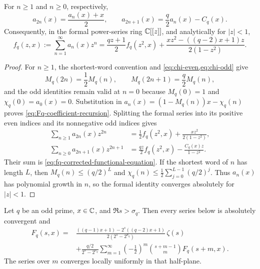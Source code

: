 \begin{proposition}
\label{prop:Fq-coefficient-recursion}
For $n\geq1$ and $n\geq0$, respectively,
\begin{equation}
 \label{eq:Fq-coefficient-recursion}
 a_{2n}(x)=\frac{a_n(x)+x}{2},
 \qquad
 a_{2n+1}(x)=\frac q2a_n(x)-C_q(x).
\end{equation}
Consequently, in the formal power-series ring $\mathbb C[[z]]$, and analytically
for $|z|<1$,
\begin{equation}
 \label{eq:fq-corrected-functional-equation}
 f_q(z,x):=\sum_{n=1}^{\infty}a_n(x)z^n
 =\frac{qz+1}{2}f_q(z^2,x)
  +\frac{xz^2-((q-2)x+1)z}{2(1-z^2)}.
\end{equation}
\end{proposition}

\begin{proof}
For $n\geq1$, the shortest-word convention and
\cref{eq:chi-even,eq:chi-odd} give
\[
 M_q(2n)=\frac12M_q(n),\qquad
 M_q(2n+1)=\frac q2M_q(n),
\]
and the odd identities remain valid at $n=0$ because $M_q(0)=1$ and
$\chi_q(0)=a_0(x)=0$.  Substitution in
$a_n(x)=(1-M_q(n))x-\chi_q(n)$ proves
\cref{eq:Fq-coefficient-recursion}.  Splitting the formal series into its
positive even indices and its nonnegative odd indices gives
\begin{align*}
 \sum_{n\geq1}a_{2n}(x)z^{2n}
 &=\frac12f_q(z^2,x)+\frac{xz^2}{2(1-z^2)},\\
 \sum_{n\geq0}a_{2n+1}(x)z^{2n+1}
 &=\frac{qz}{2}f_q(z^2,x)-\frac{C_q(x)z}{1-z^2}.
\end{align*}
Their sum is \cref{eq:fq-corrected-functional-equation}.  If the shortest
word of $n$ has length $L$, then
$M_q(n)\leq(q/2)^L$ and
$\chi_q(n)\leq\frac12\sum_{j=0}^{L-1}(q/2)^j$.
Thus $a_n(x)$ has polynomial growth in $n$, so the formal identity
converges absolutely for $|z|<1$.
\end{proof}

\begin{theorem}
\label{thm:Fq-corrected-functional-equation}
Let $q$ be an odd prime, $x\in\mathbb C$, and
$\Re s>\sigma_q$.  Then every series below is absolutely convergent and
\begin{equation}
\label{eq:Fq-functional-equation}
\begin{split}
 F_q(s,x)={}&
 \frac{((q-1)x+1)-2^s((q-2)x+1)}
      {2(2^s-2^{\sigma_q})}\,\zeta(s)\\
 &+\frac{q/2}{2^s-2^{\sigma_q}}
 \sum_{m=1}^{\infty}\left(-\frac12\right)^m
 \binom{s+m-1}{m}F_q(s+m,x).
\end{split}
\end{equation}
The series over $m$ converges locally uniformly in that half-plane.
\end{theorem}

